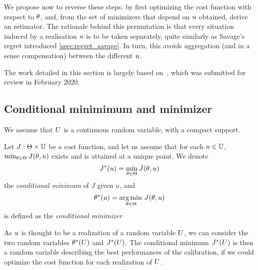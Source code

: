 \documentclass[../../Main_ManuscritThese.tex]{subfiles}
\newcommand\imgpath{/home/victor/acadwriting/Manuscrit/Text/Chapter3/img/}
\begin{document}
We propose now to reverse these steps, by first optimizing the cost function with respect to $\theta$, and, from the set of minimizers that depend on $u$ obtained, derive an estimator. The rationale behind this permutation is that every situation induced by a realisation $u$ is to be taken separately, quite similarly as Savage's regret introduced \cref{ssec:regret_savage}.
In turn, this avoids aggregation (and in a sense compensation) between the different $u$.

The work detailed in this section is largely based on~\cite{trappler_robust_2020}, which was submitted for review in February 2020.

%   


\subsection{Conditional minimimum and minimizer}
\label{sec:MPE}
We assume that $U$ is a continuous random variable, with a compact support. 
\begin{definition}
  Let $J: \Theta \times \mathbb{U}$ be a cost function, and let us assume that for each $u \in \mathbb{U}$, $\min_{\theta \in \Theta} J(\theta,u)$ exists and is attained at a unique point.
  We denote
  \begin{equation}
    J^*(u) = \min_{\theta \in \Theta} J(\theta,u)
  \end{equation}
  the \emph{conditional minimum} of $J$ given $u$, and
  \begin{equation}
    \label{eq:def_kstar}
    \theta^*(u) = \operatorname*{arg\,min \,}_{\theta\in\Theta} J(\theta, u)
  \end{equation}
 is defined as the \emph{conditional minimizer}
\end{definition}
As $u$ is thought to be a realization of a random variable $U$, we can consider the two random variables $\theta^*(U)$ and $J^*(U)$.
The conditional minimum $J^*(U)$ is then a random variable describing the best performances of the calibration, if we could optimize the cost function for each realization of $U$.
\end{document}
